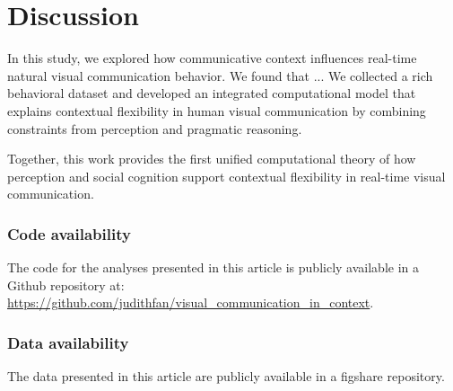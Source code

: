 \documentclass[9pt,twocolumn,twoside]{pnas-new}
\begin{document}
\section*{Discussion}

In this study, we explored how communicative context influences real-time natural visual communication behavior. We found that ... We collected a rich behavioral dataset and developed an integrated computational model that explains contextual flexibility in human visual communication by combining constraints from perception and pragmatic reasoning.





Together, this work provides the first unified computational theory of how perception and social cognition support contextual flexibility in real-time visual communication.

\subsubsection*{Code availability} The code for the analyses presented in this article is publicly available in a Github repository at: \url{https://github.com/judithfan/visual_communication_in_context}.

\subsubsection*{Data availability} The data presented in this article are publicly available in a figshare repository.


\end{document}
